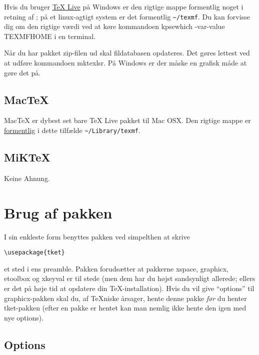 \documentclass[a4paper,article,oneside,danish]{memoir}
\newcommand{\pakkenavn}[1]{\textsf{#1}}
\newcommand{\ptket}{\pakkenavn{tket}\xspace}
\begin{document}
Hvis du bruger
\href{http://www.tug.org/texlive/doc/texlive-en/texlive-en.html#x1-380003.4.7}{\TeX{}
  Live} på Windows er den rigtige mappe formentlig noget i retning af
; på et
linux-agtigt system er det formentlig \nolinkurl{~/texmf}. Du kan
forvisse dig om den rigtige værdi ved at køre kommandoen {\ttfamily
  kpsewhich -var-value TEXMFHOME} i en terminal.

Når du har pakket zip-filen ud skal fildatabasen opdateres. Det gøres
lettest ved at udføre kommandoen {\ttfamily mktexlsr}. På Windows er
der måske en grafisk måde at gøre det på. 

\section{Mac\TeX}
\label{sec:mactex}

Mac\TeX{} er dybest set bare \TeX{} Live pakket til Mac OSX. Den
rigtige mappe er
\href{http://www.tug.org/mactex/faq/#qm04}{formentlig} i dette
tilfælde \nolinkurl{~/Library/texmf}.

\section{MiK\TeX}
\label{sec:miktex}

Keine Ahnung.

\chapter{Brug af pakken}
\label{cha:brug-af-pakken}

I sin enkleste form benyttes pakken ved simpelthen at skrive

\begin{verbatim}
\usepackage{tket}
\end{verbatim}
et sted i ens preamble. Pakken forudsætter at pakkerne
\pakkenavn{xspace}, \pakkenavn{graphicx}, \pakkenavn{etoolbox} og
\pakkenavn{xkeyval} er til stede (men dem har du højst sandsynligt
allerede; ellers er det på høje tid at opdatere din
\TeX-installation). Hvis du vil give \enquote{options} til
\pakkenavn{graphicx}-pakken skal du, af \TeX niske årsager, hente
denne pakke \emph{før} du henter \ptket-pakken (efter en pakke er
hentet kan man nemlig ikke hente den igen med nye options).

\section{Options}
\label{sec:options}
\end{document}
